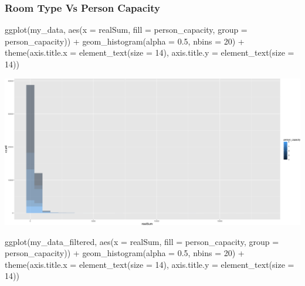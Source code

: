 \documentclass[
]{article}
\newenvironment{Shaded}{\begin{snugshade}}{\end{snugshade}}
\newcommand{\AttributeTok}[1]{\textcolor[rgb]{0.77,0.63,0.00}{#1}}
\newcommand{\DecValTok}[1]{\textcolor[rgb]{0.00,0.00,0.81}{#1}}
\newcommand{\FloatTok}[1]{\textcolor[rgb]{0.00,0.00,0.81}{#1}}
\newcommand{\FunctionTok}[1]{\textcolor[rgb]{0.00,0.00,0.00}{#1}}
\newcommand{\NormalTok}[1]{#1}
\newcommand{\SpecialCharTok}[1]{\textcolor[rgb]{0.00,0.00,0.00}{#1}}
\begin{document}
\hypertarget{room-type-vs-person-capacity}{%
\subsubsection{Room Type Vs Person
Capacity}\label{room-type-vs-person-capacity}}

\begin{Shaded}
\begin{Highlighting}[]
\FunctionTok{ggplot}\NormalTok{(my\_data, }\FunctionTok{aes}\NormalTok{(}\AttributeTok{x =}\NormalTok{ realSum, }\AttributeTok{fill =}\NormalTok{ person\_capacity, }\AttributeTok{group =}\NormalTok{ person\_capacity)) }\SpecialCharTok{+}
    \FunctionTok{geom\_histogram}\NormalTok{(}\AttributeTok{alpha =} \FloatTok{0.5}\NormalTok{, }\AttributeTok{nbins =} \DecValTok{20}\NormalTok{) }\SpecialCharTok{+} \FunctionTok{theme}\NormalTok{(}\AttributeTok{axis.title.x =} \FunctionTok{element\_text}\NormalTok{(}\AttributeTok{size =} \DecValTok{14}\NormalTok{),}
    \AttributeTok{axis.title.y =} \FunctionTok{element\_text}\NormalTok{(}\AttributeTok{size =} \DecValTok{14}\NormalTok{))}
\end{Highlighting}
\end{Shaded}

\includegraphics{Project_files/figure-latex/unnamed-chunk-19-1.png}

\begin{Shaded}
\begin{Highlighting}[]
\FunctionTok{ggplot}\NormalTok{(my\_data\_filtered, }\FunctionTok{aes}\NormalTok{(}\AttributeTok{x =}\NormalTok{ realSum, }\AttributeTok{fill =}\NormalTok{ person\_capacity,}
    \AttributeTok{group =}\NormalTok{ person\_capacity)) }\SpecialCharTok{+} \FunctionTok{geom\_histogram}\NormalTok{(}\AttributeTok{alpha =} \FloatTok{0.5}\NormalTok{, }\AttributeTok{nbins =} \DecValTok{20}\NormalTok{) }\SpecialCharTok{+}
    \FunctionTok{theme}\NormalTok{(}\AttributeTok{axis.title.x =} \FunctionTok{element\_text}\NormalTok{(}\AttributeTok{size =} \DecValTok{14}\NormalTok{), }\AttributeTok{axis.title.y =} \FunctionTok{element\_text}\NormalTok{(}\AttributeTok{size =} \DecValTok{14}\NormalTok{))}
\end{Highlighting}
\end{Shaded}
\end{document}
